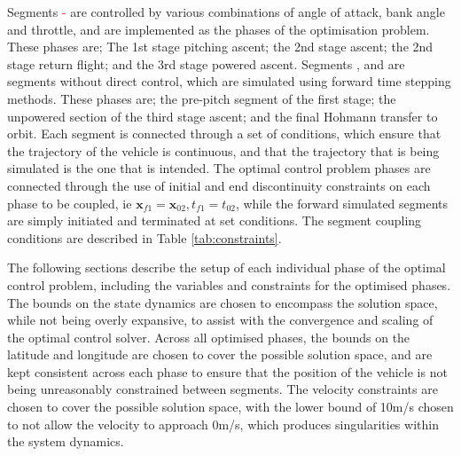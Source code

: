  Segments \textcolor{red}{-} are controlled by various combinations of angle of attack, bank angle and throttle, and are implemented as the phases of the optimisation problem. These phases are; The 1st stage pitching ascent; the 2nd stage ascent; the 2nd stage return flight; and the 3rd stage powered ascent.
 Segments \textcolor{red}{},\textcolor{red}{} and \textcolor{red}{} are segments without direct control, which are simulated using forward time stepping methods. 
 These phases are; the pre-pitch segment of the first stage; the unpowered section of the third stage ascent; and the final Hohmann transfer to orbit. 
 Each segment is connected through a set of conditions, which ensure that the trajectory of the vehicle is continuous, and that the trajectory that is being simulated is the one that is intended. 
  The optimal control problem phases are connected through the use of initial and end discontinuity constraints on each phase to be coupled, ie $\textbf{x}_{f1} = \textbf{x}_{02}, t_{f1} = t_{02}$, while the forward simulated segments are simply initiated and terminated at set conditions. 
 The segment coupling conditions are described in Table \ref{tab:constraints}.


The following sections describe the setup of each individual phase of the optimal control problem, including the variables and constraints for the optimised phases. 
The bounds on the state dynamics are chosen to encompass the solution space, while not being overly expansive, to assist with the convergence and scaling of the optimal control solver. 
Across all optimised phases, the bounds on the latitude and longitude are chosen to cover the possible solution space, and are kept consistent across each phase to ensure that the position of the vehicle is not being unreasonably constrained between segments. The velocity constraints are chosen to cover the possible solution space, with the lower bound of 10m/s chosen to not allow the velocity to approach 0m/s, which produces singularities within the system dynamics.




